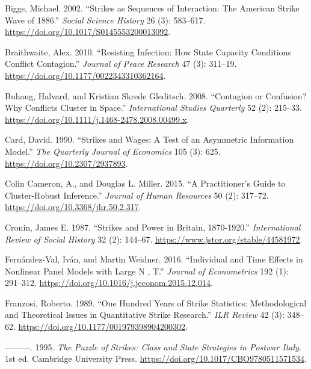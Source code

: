 \documentclass[
  11pt,
]{article}
\newlength{\cslhangindent}
\newenvironment{CSLReferences}[2] %
 {\begin{list}{}{%
  \setlength{\itemindent}{0pt}
  \setlength{\leftmargin}{0pt}
  \setlength{\parsep}{0pt}
  \ifodd #1
   \setlength{\leftmargin}{\cslhangindent}
   \setlength{\itemindent}{-1\cslhangindent}
  \fi
  \setlength{\itemsep}{#2\baselineskip}}}
 {\end{list}}
\begin{document}
\begin{CSLReferences}{1}{0}
Biggs, Michael. 2002. {``Strikes as {Sequences} of {Interaction}: {The
American Strike Wave} of 1886.''} \emph{Social Science History} 26 (3):
583--617. \url{https://doi.org/10.1017/S0145553200013092}.

Braithwaite, Alex. 2010. {``Resisting Infection: {How} State Capacity
Conditions Conflict Contagion.''} \emph{Journal of Peace Research} 47
(3): 311--19. \url{https://doi.org/10.1177/0022343310362164}.

Buhaug, Halvard, and Kristian Skrede Gleditsch. 2008. {``Contagion or
{Confusion}? {Why Conflicts Cluster} in {Space}.''} \emph{International
Studies Quarterly} 52 (2): 215--33.
\url{https://doi.org/10.1111/j.1468-2478.2008.00499.x}.

Card, David. 1990. {``Strikes and {Wages}: {A Test} of an {Asymmetric
Information Model}.''} \emph{The Quarterly Journal of Economics} 105
(3): 625. \url{https://doi.org/10.2307/2937893}.

Colin Cameron, A., and Douglas L. Miller. 2015. {``A {Practitioner}'s
{Guide} to {Cluster-Robust Inference}.''} \emph{Journal of Human
Resources} 50 (2): 317--72. \url{https://doi.org/10.3368/jhr.50.2.317}.

Cronin, James E. 1987. {``Strikes and {Power} in {Britain},
1870-1920.''} \emph{International Review of Social History} 32 (2):
144--67. \url{https://www.jstor.org/stable/44581972}.

Fernández-Val, Iván, and Martin Weidner. 2016. {``Individual and Time
Effects in Nonlinear Panel Models with Large {N} , {T}.''} \emph{Journal
of Econometrics} 192 (1): 291--312.
\url{https://doi.org/10.1016/j.jeconom.2015.12.014}.

Franzosi, Roberto. 1989. {``One {Hundred Years} of {Strike Statistics}:
{Methodological} and {Theoretical Issues} in {Quantitative Strike
Research}.''} \emph{ILR Review} 42 (3): 348--62.
\url{https://doi.org/10.1177/001979398904200302}.

---------. 1995. \emph{The {Puzzle} of {Strikes}: {Class} and {State
Strategies} in {Postwar Italy}}. 1st ed. Cambridge University Press.
\url{https://doi.org/10.1017/CBO9780511571534}.


\end{CSLReferences}
\end{document}
